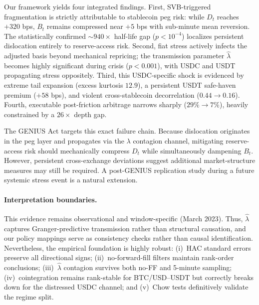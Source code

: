 \documentclass[12pt,twocolumn]{article}
\begin{document}
Our framework yields four integrated findings. First, SVB-triggered fragmentation is strictly attributable to stablecoin peg risk: while $D_t$ reaches $+320$ bps, $B_t$ remains compressed near $+5$ bps with sub-minute mean reversion. The statistically confirmed ${\sim}940\times$ half-life gap ($p{<}10^{-4}$) localizes persistent dislocation entirely to reserve-access risk. Second, fiat stress actively infects the adjusted basis beyond mechanical repricing; the transmission parameter $\hat\lambda$ becomes highly significant during crisis ($p{<}0.001$), with USDC and USDT propagating stress oppositely. Third, this USDC-specific shock is evidenced by extreme tail expansion (excess kurtosis $12.9$), a persistent USDT safe-haven premium ($+58$ bps), and violent cross-stablecoin decorrelation ($0.44\to0.16$). Fourth, executable post-friction arbitrage narrows sharply ($29\%\to7\%$), heavily constrained by a $26\times$ depth gap.

The GENIUS Act targets this exact failure chain. Because dislocation originates in the peg layer and propagates via the $\lambda$ contagion channel, mitigating reserve-access risk should mechanically compress $D_t$ while simultaneously dampening $B_t$. However, persistent cross-exchange deviations suggest additional market-structure measures may still be required. A post-GENIUS replication study during a future systemic stress event is a natural extension.

\paragraph{Interpretation boundaries.} This evidence remains observational and window-specific (March 2023). Thus, $\hat\lambda$ captures Granger-predictive transmission rather than structural causation, and our policy mappings serve as consistency checks rather than causal identification. Nevertheless, the empirical foundation is highly robust: (i)~HAC standard errors preserve all directional signs; (ii)~no-forward-fill filters maintain rank-order conclusions; (iii)~$\hat\lambda$ contagion survives both no-FF and 5-minute sampling; (iv)~cointegration remains rank-stable for BTC/USD--USDT but correctly breaks down for the distressed USDC channel; and (v)~Chow tests definitively validate the regime split.

\newpage
\end{document}
